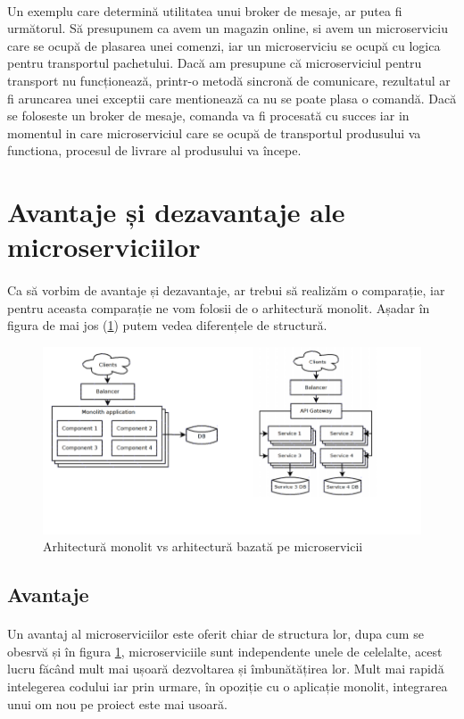 \documentclass[12pt]{report}
\begin{document}
	\paragraph{}Un exemplu care determină utilitatea unui broker de mesaje, ar putea fi următorul. Să presupunem ca avem un magazin online, si avem un microserviciu care se ocupă de plasarea unei comenzi, iar un microserviciu se ocupă cu logica pentru transportul pachetului. Dacă am presupune că microserviciul pentru transport nu funcționează, printr-o metodă sincronă de comunicare, rezultatul ar fi aruncarea unei exceptii care mentionează ca nu se poate plasa o comandă. Dacă se foloseste un broker de mesaje, comanda va fi procesată cu succes iar in momentul in care microserviciul care se ocupă de transportul produsului va functiona, procesul de livrare al produsului va începe.
	\section{Avantaje și dezavantaje ale microserviciilor}
	\paragraph{}Ca să vorbim de avantaje și dezavantaje, ar trebui să realizăm o comparație, iar pentru aceasta comparație ne vom folosii de o arhitectură monolit. Așadar în figura de mai jos (\ref{movsmicr}) putem vedea diferențele de structură. 
	\begin{figure}[h]
  	\centering
  	\includegraphics[scale=1]{movsmicr}
	\caption{Arhitectură monolit vs arhitectură bazată pe microservicii \cite{savchenko2015microservices}}
	\label{movsmicr}
  	\end{figure}
  	\subsection{Avantaje}
  	\paragraph{}Un avantaj al microserviciilor este oferit chiar de structura lor, dupa cum se obesrvă și în figura \ref{movsmicr}, microserviciile sunt independente unele de celelalte, acest lucru făcând mult mai ușoară dezvoltarea și îmbunătățirea lor. Mult mai rapidă intelegerea codului iar prin urmare, în opoziție cu o aplicație monolit, integrarea unui om nou pe proiect este mai usoară.
\end{document}
